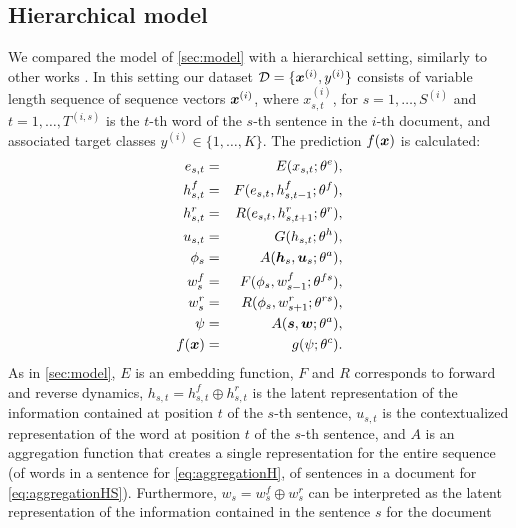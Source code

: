 \subsection{Hierarchical model}
\label{sec:modelh}
We compared the model of \cref{sec:model} with a hierarchical setting,
similarly to other works \cite{yang_hierarchical_2016}. In this
setting our dataset $\mathcal{D}=\{\bm{x}^{(i)},y^{(i)}\}$
consists of variable length sequence of sequence vectors
$\bm{x}^{(i)}$, where $x_{s,t}^{(i)}$, for $s=1,\dots,S^{(i)}$ and
$t=1,\dots,T^{(i,s)}$ is the $t$-th word of the $s$-th sentence in the
$i$-th document, and associated target classes
$y^{(i)}\in\{1,\dots,K\}$. The prediction $f(\bm{x})$ is calculated:
\begin{align}
  e_{s,t} &=& E(x_{s,t};\theta^e),\label{eq:embedH}\\
  h^f_{s,t} &=& F(e_{s,t},h^f_{s,t-1};\theta^{f}),\label{eq:maxModelRLH}\\  
  h^r_{s,t} &=& R(e_{s,t},h^r_{s,t+1};\theta^{r}),\label{eq:maxModelRRH}\\
  u_{s,t} &=& G(h_{s,t};\theta^{h}),\label{eq:maxModelFH}\\
  \phi_s & =& A(\bm{h}_s,\bm{u}_s;\theta^{a}),\label{eq:aggregationH}\\
  w^f_{s} &=& F(\phi_{s},w^f_{s-1};\theta^{fs}),\label{eq:maxModelRLHS}\\  
  w^r_{s} &=& R(\phi_{s},w^r_{s+1};\theta^{rs}),\label{eq:maxModelRRHS}\\
  \psi & =& A(\bm{s},\bm{w};\theta^{a}),\label{eq:aggregationHS}\\
  f(\bm{x}) &=& g(\psi;\theta^c).\label{eq:maxModelCH}
\end{align}
As in \cref{sec:model}, $E$ is an embedding function, $F$ and $R$
corresponds to forward and reverse dynamics,
$h_{s,t}=h_{s,t}^f\oplus h_{s,t}^r$ is the latent representation of
the information contained at position $t$ of the $s$-th sentence,
$u_{s,t}$ is the contextualized representation of the word at position
$t$ of the $s$-th sentence, and $A$ is an aggregation function that
creates a single representation for the entire sequence (of words in a
sentence for \eqref{eq:aggregationH}, of sentences in a document for
\eqref{eq:aggregationHS}). Furthermore, $w_s=w_s^f\oplus w_s^r$
can be interpreted as the
latent representation of the information contained in the sentence $s$
for the document

